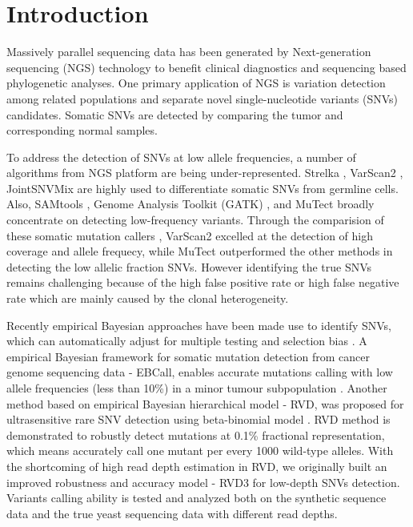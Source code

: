 \documentclass[11pt,reqno]{amsart}
\begin{document}
\maketitle

\section{Introduction}

Massively parallel sequencing data has been generated by Next-generation sequencing (NGS) technology to benefit clinical diagnostics and sequencing based phylogenetic analyses.
One primary application of NGS is variation detection among related populations and separate novel single-nucleotide variants (SNVs) candidates.
Somatic SNVs are detected by comparing the tumor and corresponding normal samples.

To address the detection of SNVs at low allele frequencies, a number of algorithms from NGS platform are being under-represented.
Strelka \citep{Saunders:2012fh}, VarScan2 \citep{Koboldt:2012cga}, JointSNVMix \citep{roth2012jointsnvmix} are highly used to differentiate somatic SNVs from germline cells.
Also, SAMtools \citep{li2009sequence}, Genome Analysis Toolkit (GATK) \citep{McKenna:2010bva}, and MuTect \citep{Cibulskis:2013ta} broadly concentrate on detecting low-frequency variants.
Through the comparision of these somatic mutation callers \citep{wang2013detecting}, VarScan2 excelled at the detection of high coverage and allele frequecy, while MuTect outperformed the other methods in detecting the low allelic fraction SNVs.
However identifying the true SNVs remains challenging because of the high false positive rate or high false negative rate which are mainly caused by the clonal heterogeneity.

Recently empirical Bayesian approaches have been made use to identify SNVs, which can automatically adjust for multiple testing and selection bias \citep{liao2014prior}.
A empirical Bayesian framework for somatic mutation detection from cancer genome sequencing data - EBCall, enables accurate mutations calling with low allele frequencies (less than 10\%) in a minor tumour subpopulation \citep{shiraishi2013empirical}.
Another method based on empirical Bayesian hierarchical model - RVD, was proposed for ultrasensitive rare SNV detection using beta-binomial model \citep{Flaherty:2011ja}.
RVD method is demonstrated to robustly detect mutations at 0.1\% fractional representation, which means accurately call one mutant per every 1000 wild-type alleles.
With the shortcoming of high read depth estimation in RVD, we originally built an improved robustness and accuracy model - RVD3 for low-depth SNVs detection.
Variants calling ability is tested and analyzed both on the synthetic sequence data and the true yeast sequencing data with different read depths.
\end{document}
